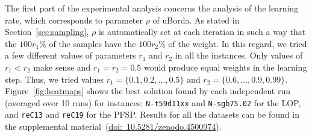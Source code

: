 \documentclass[sigconf,dvipsnames]{acmart}
\newcommand{\supplement}{\href{http://doi.org/10.5281/zenodo.4500974}{doi:~10.5281/zenodo.4500974}}
\begin{document}
The first part of the experimental analysis concerns the analysis of the learning rate, which corresponds to parameter $\rho$ of uBorda. As stated in Section~\ref{sec:sampling}, $\rho$ is automatically set at each iteration in such a way that the $100r_1\%$ of the samples have the $100r_2\%$ of the weight. In this regard, we tried a few different values of parameters $r_1$ and $r_2$ in all the instances. Only values of $r_1 < r_2$ make sense and $r_1 = r_2 = 0.5$ would produce equal weights in the learning step. Thus, we tried values $r_1 = \{0.1, 0.2, \dotsc, 0.5\}$ and $r_2 = \{0.6,\dotsc, 0.9, 0.99\}$. Figure~\ref{fig:heatmaps} shows the best solution found by each independent run (averaged over 10 runs) for instances: \texttt{N-t59d11xx} and \texttt{N-sgb75.02} for the LOP, and \texttt{reC13} and \texttt{reC19} for the PFSP. Results for all the datasets can be found in the supplemental material~(\supplement).
\end{document}
